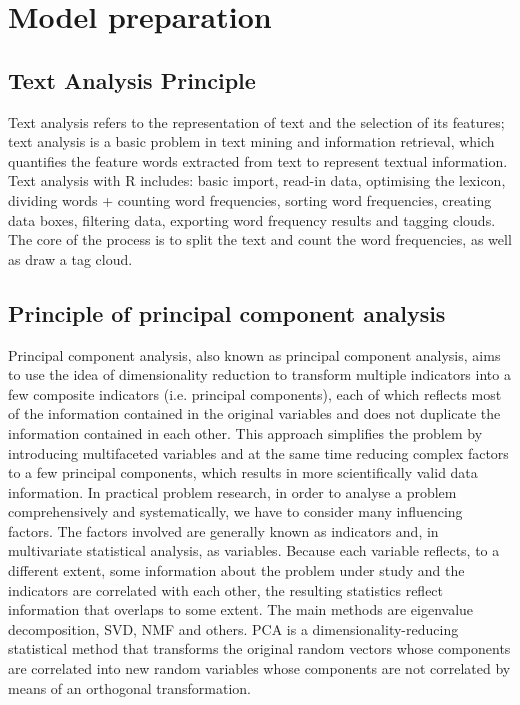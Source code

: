 \documentclass{apmcmthesis}
\begin{document}
\section{Model preparation}
\subsection{Text Analysis Principle}
Text analysis refers to the representation of text and the selection of its features; text analysis is a basic problem in text mining and information retrieval, which quantifies the feature words extracted from text to represent textual information. Text analysis with R includes: basic import, read-in data, optimising the lexicon, dividing words + counting word frequencies, sorting word frequencies, creating data boxes, filtering data, exporting word frequency results and tagging clouds. The core of the process is to split the text and count the word frequencies, as well as draw a tag cloud.
\subsection{Principle of principal component analysis}
Principal component analysis, also known as principal component analysis, aims to use the idea of dimensionality reduction to transform multiple indicators into a few composite indicators (i.e. principal components), each of which reflects most of the information contained in the original variables and does not duplicate the information contained in each other. This approach simplifies the problem by introducing multifaceted variables and at the same time reducing complex factors to a few principal components, which results in more scientifically valid data information. In practical problem research, in order to analyse a problem comprehensively and systematically, we have to consider many influencing factors. The factors involved are generally known as indicators and, in multivariate statistical analysis, as variables. Because each variable reflects, to a different extent, some information about the problem under study and the indicators are correlated with each other, the resulting statistics reflect information that overlaps to some extent. The main methods are eigenvalue decomposition, SVD, NMF and others. 
PCA is a dimensionality-reducing statistical method that transforms the original random vectors whose components are correlated into new random variables whose components are not correlated by means of an orthogonal transformation.
\end{document}
